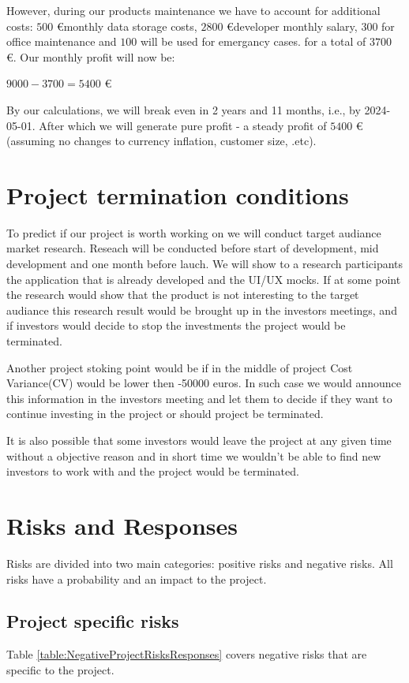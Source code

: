 \documentclass{VUMIFPSkursinis}
\begin{document}
However, during our products maintenance we have to account for additional costs: $500$ \euro monthly data storage costs, $2800$ \euro developer monthly salary, $300$ for office maintenance and $100$ will be used for emergancy cases. for a total of $3700$ \euro. Our monthly profit will now be:
\begin{center}
	$9000 - 3700 = 5400$ \euro
\end{center}
  By our calculations, we will break even in 2 years and 11 months, i.e., by 2024-05-01. After which we will generate pure profit - a steady profit of $5400$ \euro (assuming no changes to currency inflation, customer size, .etc).

\section{Project termination conditions}
	To predict if our project is worth working on we will conduct target audiance market research.
	Reseach will be conducted before start of development, mid development and one month before lauch.
	We will show to a research participants the application that is already developed and the UI/UX mocks.
	If at some point the research would show that the product is not interesting to the target audiance this research result would be brought up in the investors meetings, and if investors would decide to stop the investments the project would be terminated.
	

	Another project stoking point would be if in the middle of project Cost Variance(CV) would be lower then -50000 euros.
	In such case we would announce this information in the investors meeting and let them to decide if they want to continue investing in the project or should project be terminated.


	It is also possible that some investors would leave the project at any given time without a objective reason and in short time we wouldn't be able to find new investors to work with and the project would be terminated.


\section{Risks and Responses}
Risks are divided into two main categories: positive risks and negative risks. All risks have a probability and an impact to the project.

\subsection{Project specific risks}
Table \ref{table:NegativeProjectRisksResponses} covers negative risks that are specific to the project.
\end{document}
